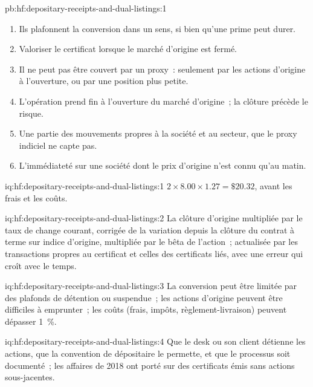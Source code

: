 \begin{solution}{pb:hf:depositary-receipts-and-dual-listings:1}
\begin{enumerate}
\item Ils plafonnent la conversion dans un sens, si bien qu'une prime peut durer.
\item Valoriser le certificat lorsque le marché d'origine est fermé.
\item Il ne peut pas être couvert par un proxy~: seulement par les actions d'origine à l'ouverture, ou par une position plus petite.
\item L'opération prend fin à l'ouverture du marché d'origine~; la clôture précède le risque.
\item Une partie des mouvements propres à la société et au secteur, que le proxy indiciel ne capte pas.
\item L'immédiateté sur une société dont le prix d'origine n'est connu qu'au matin.
\end{enumerate}
\end{solution}

\begin{solution}{iq:hf:depositary-receipts-and-dual-listings:1}
$2\times8.00\times1.27=\$20.32$, avant les frais et les coûts.
\end{solution}

\begin{solution}{iq:hf:depositary-receipts-and-dual-listings:2}
La clôture d'origine multipliée par le taux de change courant, corrigée de la variation depuis la clôture du contrat à terme sur indice d'origine, multipliée par le bêta de l'action~; actualisée par les
transactions propres au certificat et celles des certificats liés, avec une erreur qui croît avec le temps.
\end{solution}

\begin{solution}{iq:hf:depositary-receipts-and-dual-listings:3}
La conversion peut être limitée par des plafonds de détention ou suspendue~; les actions d'origine peuvent être difficiles à emprunter~; les coûts (frais, impôts, règlement-livraison) peuvent dépasser 1~\%.
\end{solution}

\begin{solution}{iq:hf:depositary-receipts-and-dual-listings:4}
Que le desk ou son client détienne les actions, que la convention de dépositaire le permette, et que le processus soit documenté~; les affaires de 2018 ont porté sur
des certificats émis sans actions sous-jacentes.
\end{solution}

